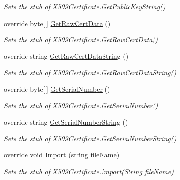 \begin{DoxyCompactItemize}
\begin{DoxyCompactList}\small\item\em Sets the stub of X509\-Certificate.\-Get\-Public\-Key\-String()\end{DoxyCompactList}\item 
override byte\mbox{[}$\,$\mbox{]} \hyperlink{class_system_1_1_security_1_1_cryptography_1_1_x509_certificates_1_1_fakes_1_1_stub_x509_certificate_ade42bcc3308de8d4e0ebf23da611743a}{Get\-Raw\-Cert\-Data} ()
\begin{DoxyCompactList}\small\item\em Sets the stub of X509\-Certificate.\-Get\-Raw\-Cert\-Data()\end{DoxyCompactList}\item 
override string \hyperlink{class_system_1_1_security_1_1_cryptography_1_1_x509_certificates_1_1_fakes_1_1_stub_x509_certificate_a6702135d6d782b58c603f9c1c8091c9b}{Get\-Raw\-Cert\-Data\-String} ()
\begin{DoxyCompactList}\small\item\em Sets the stub of X509\-Certificate.\-Get\-Raw\-Cert\-Data\-String()\end{DoxyCompactList}\item 
override byte\mbox{[}$\,$\mbox{]} \hyperlink{class_system_1_1_security_1_1_cryptography_1_1_x509_certificates_1_1_fakes_1_1_stub_x509_certificate_a99c98888e1cc43d0a64bc311086e7d3d}{Get\-Serial\-Number} ()
\begin{DoxyCompactList}\small\item\em Sets the stub of X509\-Certificate.\-Get\-Serial\-Number()\end{DoxyCompactList}\item 
override string \hyperlink{class_system_1_1_security_1_1_cryptography_1_1_x509_certificates_1_1_fakes_1_1_stub_x509_certificate_a3bd5f45ffd7bab001c7972cb1c432eeb}{Get\-Serial\-Number\-String} ()
\begin{DoxyCompactList}\small\item\em Sets the stub of X509\-Certificate.\-Get\-Serial\-Number\-String()\end{DoxyCompactList}\item 
override void \hyperlink{class_system_1_1_security_1_1_cryptography_1_1_x509_certificates_1_1_fakes_1_1_stub_x509_certificate_af4c05b052f5ae8f32847ac881b4733fa}{Import} (string file\-Name)
\begin{DoxyCompactList}\small\item\em Sets the stub of X509\-Certificate.\-Import(\-String file\-Name)\end{DoxyCompactList}\item 

\end{DoxyCompactItemize}
